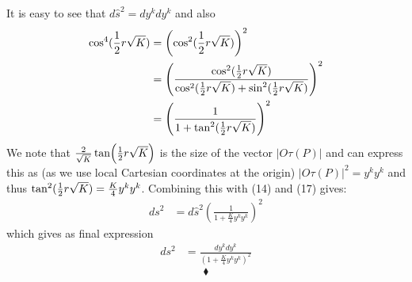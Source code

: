 It is easy to see that $d \hat{s}^2 =  dy^k dy^k$ and also
\begin{align}
\cos^4(\frac{1}{2} r \sqrt{K}) &= \left(\cos^2(\frac{1}{2} r \sqrt{K})\right)^2\\
 &= \left(\frac{\cos^2(\frac{1}{2} r \sqrt{K})}{\cos^2(\frac{1}{2} r \sqrt{K})+\sin^2(\frac{1}{2} r  \sqrt{K})}\right)^2\\
&= \left(\frac{1}{1+\tan^2(\frac{1}{2} r  \sqrt{K})}\right)^2
\end{align}
We note that $\frac{2}{\sqrt{K}}\tan(\frac{1}{2} r  \sqrt{K})$ is the size of the vector $\left|O\tau(P)\right|$ and can express this as (as we use local Cartesian coordinates at the origin) $\left|O\tau(P)\right|^2 = y^ky^k$ and thus $\tan^2(\frac{1}{2} r  \sqrt{K}) =\frac{K}{4}y^ky^k$. Combining this with (14) and (17) gives:
\begin{align}
ds^2 &= d \hat{s}^2\left(\frac{1}{1+\frac{K}{4}y^ky^k}\right)^2
\end{align} 
which gives as final expression 
\begin{align}
ds^2 &= \frac{dy^k dy^k}{\left(1+\frac{K}{4}y^ky^k\right)^2}
\end{align}
$$\blacklozenge$$
\newpage

